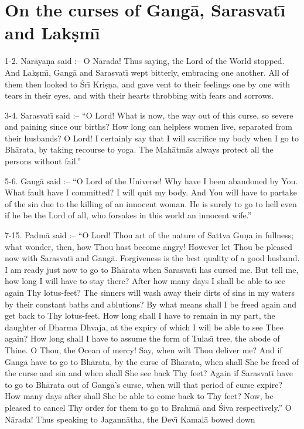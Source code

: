\chapter{On the curses of Gang\=a, Sarasvat\={\i} and Lak\d{s}m\={\i}}

1-2. N\=ar\=aya\d{n}a said :-- O N\=arada! Thus saying, the Lord of the World stopped. And Lak\d{s}m\={\i}, Gang\=a and Sarasvat\={\i} wept bitterly, embracing one another. All of them then looked to \'Sr\={\i} Kri\d{s}\d{n}a, and gave vent to their feelings one by one with tears in their eyes, and with their hearts throbbing with fears and sorrows.

3-4. Sarasvat\={\i} said :-- ``O Lord! What is now, the way out of this curse, so severe and paining since our births? How long can helpless women live, separated from their husbands? O Lord! I certainly say that I will sacrifice my body when I go to Bh\=arata, by taking recourse to yoga. The Mah\=atm\=as always protect all the persons without fail.''

5-6. Gang\=a said :-- ``O Lord of the Universe! Why have I been abandoned by You. What fault have I committed? I will quit my body. And You will have to partake of the sin due to the killing of an innocent woman. He is surely to go to hell even if he be the Lord of all, who forsakes in this world an innocent wife.''

7-15. Padm\=a said :-- ``O Lord! Thou art of the nature of Sattva Gu\d{n}a in fullness; what wonder, then, how Thou hast become angry! However let Thou be pleased now with Sarasvat\={\i} and Gang\=a. Forgiveness is the best quality of a good husband. I am ready just now to go to Bh\=arata when Sarasvat\={\i} has cursed me. But tell me, how long I will have to stay there? After how many days I shall be able to see again Thy lotus-feet? The sinners will wash away their dirts of sins in my waters by their constant baths and ablutions? By what means shall I be freed again and get back to Thy lotus-feet. How long shall I have to remain in my part, the daughter of Dharma Dhvaja, at the expiry of which I will be able to see Thee again? How long shall I have to assume the form of Tulas\={\i} tree, the abode of Thine. O Thou, the Ocean of mercy! Say, when wilt Thou deliver me? And if Gang\=a have to go to Bh\=arata, by the curse of Bh\=arata, when shall She be freed of the curse and sin and when shall She see back Thy feet? Again if Sarasvat\={\i} have to go to Bh\=arata out of Gang\=a's curse, when will that period of curse expire? How many days after shall She be able to come back to Thy feet? Now, be pleased to cancel Thy order for them to go to Brahm\=a and \'Siva respectively.'' O N\=arada! Thus speaking to Jagann\=atha, the Dev\={\i} Kamal\=a bowed down

